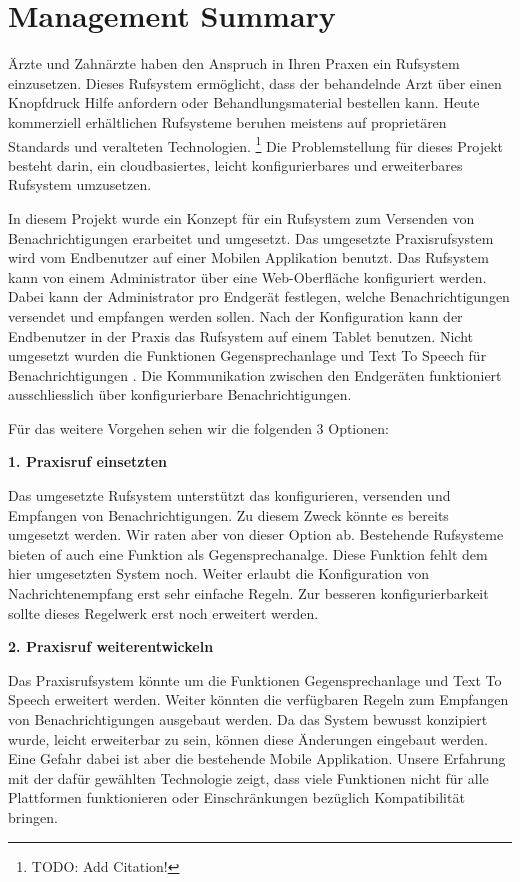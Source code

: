 \section*{Management Summary}

Ärzte und Zahnärzte haben den Anspruch in Ihren Praxen ein Rufsystem einzusetzen.
Dieses Rufsystem ermöglicht, dass der behandelnde Arzt über einen Knopfdruck Hilfe anfordern oder Behandlungsmaterial bestellen kann.
Heute kommerziell erhältlichen Rufsysteme beruhen meistens auf proprietären Standards und veralteten Technologien. \footnote{TODO: Add Citation!}
Die Problemstellung für dieses Projekt besteht darin, ein cloudbasiertes, leicht konfigurierbares und erweiterbares Rufsystem umzusetzen.

In diesem Projekt wurde ein Konzept für ein Rufsystem zum Versenden von Benachrichtigungen erarbeitet und umgesetzt.
Das umgesetzte Praxisrufsystem wird vom Endbenutzer auf einer Mobilen Applikation benutzt.
Das Rufsystem kann von einem Administrator über eine Web-Oberfläche konfiguriert werden.
Dabei kann der Administrator pro Endgerät festlegen, welche Benachrichtigungen versendet und empfangen werden sollen.
Nach der Konfiguration kann der Endbenutzer in der Praxis das Rufsystem auf einem Tablet benutzen.
Nicht umgesetzt wurden die Funktionen Gegensprechanlage und Text To Speech für Benachrichtigungen .
Die Kommunikation zwischen den Endgeräten funktioniert ausschliesslich über konfigurierbare Benachrichtigungen.

Für das weitere Vorgehen sehen wir die folgenden 3 Optionen:


\textbf{1. Praxisruf einsetzten}

Das umgesetzte Rufsystem unterstützt das konfigurieren, versenden und Empfangen von Benachrichtigungen.
Zu diesem Zweck könnte es bereits umgesetzt werden.
Wir raten aber von dieser Option ab.
Bestehende Rufsysteme bieten of auch eine Funktion als Gegensprechanalge.
Diese Funktion fehlt dem hier umgesetzten System noch.
Weiter erlaubt die Konfiguration von Nachrichtenempfang erst sehr einfache Regeln.
Zur besseren konfigurierbarkeit sollte dieses Regelwerk erst noch erweitert werden.

\textbf{2. Praxisruf weiterentwickeln}

Das Praxisrufsystem könnte um die Funktionen Gegensprechanlage und Text To Speech erweitert werden.
Weiter könnten die verfügbaren Regeln zum Empfangen von Benachrichtigungen ausgebaut werden.
Da das System bewusst konzipiert wurde, leicht erweiterbar zu sein, können diese Änderungen eingebaut werden.
Eine Gefahr dabei ist aber die bestehende Mobile Applikation.
Unsere Erfahrung mit der dafür gewählten Technologie zeigt, dass viele Funktionen nicht für alle Plattformen funktionieren
oder Einschränkungen bezüglich Kompatibilität bringen.

